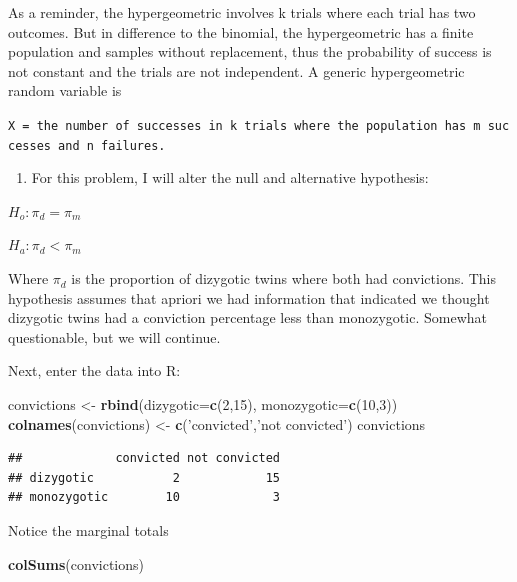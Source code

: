 \documentclass[]{book}
\newenvironment{Shaded}{\begin{snugshade}}{\end{snugshade}}
\newcommand{\KeywordTok}[1]{\textcolor[rgb]{0.13,0.29,0.53}{\textbf{#1}}}
\newcommand{\DataTypeTok}[1]{\textcolor[rgb]{0.13,0.29,0.53}{#1}}
\newcommand{\DecValTok}[1]{\textcolor[rgb]{0.00,0.00,0.81}{#1}}
\newcommand{\StringTok}[1]{\textcolor[rgb]{0.31,0.60,0.02}{#1}}
\newcommand{\NormalTok}[1]{#1}
\providecommand{\tightlist}{%
  \setlength{\itemsep}{0pt}\setlength{\parskip}{0pt}}
\theoremstyle{definition}
\theoremstyle{definition}
\theoremstyle{definition}
\theoremstyle{remark}
\begin{document}
As a reminder, the hypergeometric involves k trials where each trial has
two outcomes. But in difference to the binomial, the hypergeometric has
a finite population and samples without replacement, thus the
probability of success is not constant and the trials are not
independent. A generic hypergeometric random variable is

\texttt{X\ =\ the\ number\ of\ successes\ in\ k\ trials\ where\ the\ population\ has\ m\ successes\ and\ n\ failures.}

\begin{enumerate}
\def\labelenumi{\arabic{enumi}.}
\tightlist
\item
  For this problem, I will alter the null and alternative hypothesis:
\end{enumerate}

\(H_o: \pi_{d}=\pi_{m}\)

\(H_a: \pi_{d} < \pi_{m}\)

Where \(\pi_{d}\) is the proportion of dizygotic twins where both had
convictions. This hypothesis assumes that apriori we had information
that indicated we thought dizygotic twins had a conviction percentage
less than monozygotic. Somewhat questionable, but we will continue.

Next, enter the data into R:

\begin{Shaded}
\begin{Highlighting}[]
\NormalTok{convictions <-}\StringTok{ }\KeywordTok{rbind}\NormalTok{(}\DataTypeTok{dizygotic=}\KeywordTok{c}\NormalTok{(}\DecValTok{2}\NormalTok{,}\DecValTok{15}\NormalTok{), }\DataTypeTok{monozygotic=}\KeywordTok{c}\NormalTok{(}\DecValTok{10}\NormalTok{,}\DecValTok{3}\NormalTok{))}
\KeywordTok{colnames}\NormalTok{(convictions) <-}\StringTok{ }\KeywordTok{c}\NormalTok{(}\StringTok{'convicted'}\NormalTok{,}\StringTok{'not convicted'}\NormalTok{)}
\NormalTok{convictions}
\end{Highlighting}
\end{Shaded}

\begin{verbatim}
##             convicted not convicted
## dizygotic           2            15
## monozygotic        10             3
\end{verbatim}

Notice the marginal totals

\begin{Shaded}
\begin{Highlighting}[]
\KeywordTok{colSums}\NormalTok{(convictions)}
\end{Highlighting}
\end{Shaded}
\end{document}
